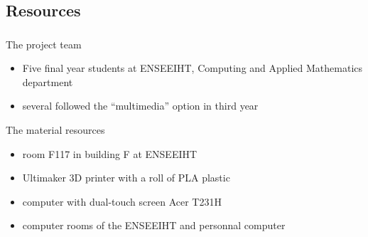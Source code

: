 \documentclass{beamer}
\begin{document}
\subsection{Resources}
\begin{frame}
	\frametitle{}
	
	\begin{block}{The project team}
		\begin{itemize}
		\item Five final year students at ENSEEIHT, Computing and Applied Mathematics department
		\item several followed the “multimedia” option in third year
		\end{itemize}
    \end{block}
    
    \begin{block}{The material resources}
    	\begin{itemize}
		\item room F117 in building F at ENSEEIHT
    	\item Ultimaker 3D printer with a roll of PLA plastic
    	\item computer with dual-touch screen Acer T231H
    	\item computer rooms of the ENSEEIHT and personnal computer
		\end{itemize}
    \end{block}
      
\end{frame}
\end{document}
